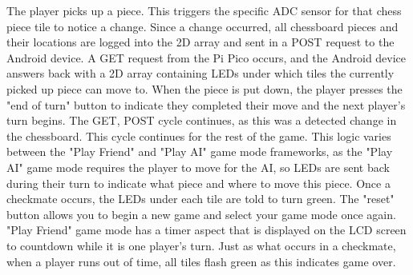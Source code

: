 \documentclass[11pt,journal]{IEEEtran}
\begin{document}
The player picks up a piece. This triggers the specific ADC sensor for that chess piece tile to notice a change. Since a change occurred, all chessboard pieces and their locations are logged into the 2D array and sent in a POST request to the Android device. A GET request from the Pi Pico occurs, and the Android device answers back with a 2D array containing LEDs under which tiles the currently picked up piece can move to. When the piece is put down, the player presses the "end of turn" button to indicate they completed their move and the next player's turn begins. The GET, POST cycle continues, as this was a detected change in the chessboard. This cycle continues for the rest of the game. This logic varies between the "Play Friend" and "Play AI" game mode frameworks, as the "Play AI" game mode requires the player to move for the AI, so LEDs are sent back during their turn to indicate what piece and where to move this piece. Once a checkmate occurs, the LEDs under each tile are told to turn green. The "reset" button allows you to begin a new game and select your game mode once again. "Play Friend" game mode has a timer aspect that is displayed on the LCD screen to countdown while it is one player's turn. Just as what occurs in a checkmate, when a player runs out of time, all tiles flash green as this indicates game over.
\end{document}
